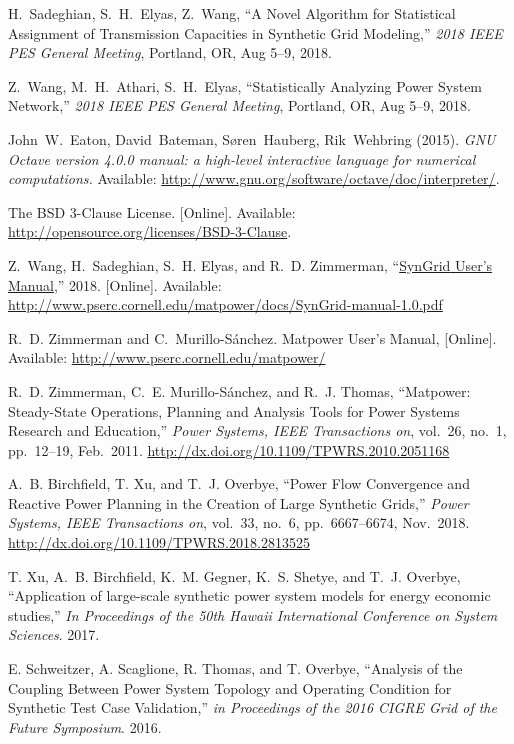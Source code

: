 \documentclass[12pt]{article}
\newcommand{\matpower}[0]{{\sc Matpower}}
\newcommand{\matpowerurl}[0]{http://www.pserc.cornell.edu/matpower/}
\newcommand{\syngrid}[0]{{SynGrid}}
\newcommand{\syngridver}[0]{1.0}
\newcommand{\syngridmanurl}[0]{http://www.pserc.cornell.edu/matpower/docs/SynGrid-manual-\syngridver.pdf}
\newcommand{\syngridman}[0]{\href{\syngridmanurl}{\syngrid{} User's Manual}}
\numberwithin{equation}{section}
\numberwithin{table}{section}
\numberwithin{figure}{section}
\begin{document}
\begin{thebibliography}{99}
H.~Sadeghian, S.~H.~Elyas, Z.~Wang, ``A Novel Algorithm for Statistical Assignment of Transmission Capacities in Synthetic Grid Modeling,''
\emph{2018 IEEE PES General Meeting}, Portland, OR, Aug 5--9, 2018.

Z.~Wang, M.~H.~Athari, S.~H.~Elyas, ``Statistically Analyzing Power System Network,'' \emph{2018 IEEE PES General Meeting}, Portland, OR, Aug 5--9, 2018.

John~W.~Eaton, David~Bateman, S{\o}ren~Hauberg, Rik~Wehbring (2015). \emph{GNU Octave version 4.0.0 manual: a high-level interactive language for numerical computations.} Available: \url{http://www.gnu.org/software/octave/doc/interpreter/}.

The BSD 3-Clause License. [Online]. Available: \url{http://opensource.org/licenses/BSD-3-Clause}.

Z.~Wang, H.~Sadeghian, S.~H. Elyas, and R.~D. Zimmerman, ``\syngridman{},'' 2018.
  [Online]. Available: \url{\syngridmanurl}

R.~D. Zimmerman and C.~Murillo-S{\'a}nchez. \matpower{} User's Manual,
  [Online]. Available: \url{\matpowerurl}

R.~D. Zimmerman, C.~E. Murillo-S{\'a}nchez, and R.~J. Thomas, ``\matpower{}: Steady-State Operations, Planning and Analysis Tools for Power Systems Research and Education,'' \emph{Power Systems, IEEE Transactions on}, vol.~26, no.~1, pp.~12--19, Feb.~2011. \url{http://dx.doi.org/10.1109/TPWRS.2010.2051168}

A.~B. Birchfield, T. Xu, and T.~J. Overbye, ``Power Flow Convergence and Reactive Power Planning in the Creation of Large Synthetic Grids,''  \emph{Power Systems, IEEE Transactions on}, vol.~33, no.~6, pp.~6667--6674, Nov.~2018.\\ \url{http://dx.doi.org/10.1109/TPWRS.2018.2813525}

T. Xu, A.~B. Birchfield, K.~M. Gegner, K.~S. Shetye, and T.~J. Overbye, ``Application of large-scale synthetic power system models for energy economic studies,''  \emph{In Proceedings of the 50th Hawaii International Conference on System Sciences}. 2017.

E. Schweitzer, A. Scaglione, R. Thomas, and T. Overbye, ``Analysis of the Coupling Between Power System Topology and Operating Condition for Synthetic Test Case Validation,'' \emph{in Proceedings of the 2016 CIGRE Grid of the Future Symposium}. 2016.
\end{thebibliography}
\end{document}
